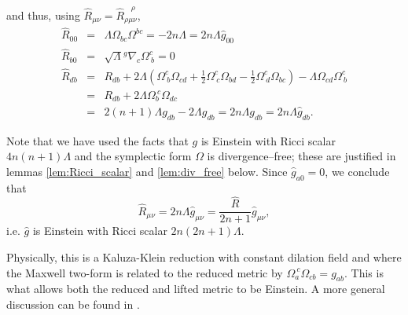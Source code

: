 and thus, using $\hat{R}_{\mu\nu}=\hat{R}_{\rho\mu\nu}^{\ \ \ \ \rho}$,
\begin{eqnarray*}
\hat{R}_{00} & = & \Lambda\Omega_{bc}\Omega^{bc}=-2n\Lambda=2n\Lambda\hat{g}_{00}\\
\hat{R}_{b0} & = & \sqrt{\Lambda}{^g\nabla}_{c}\Omega_{\ b}^{c}=0\\
\hat{R}_{db} & = & R_{db}+2\Lambda(\Omega_{\ b}^{c}\Omega_{cd}+\frac{1}{2}\Omega_{\ c}^{c}\Omega_{bd}-\frac{1}{2}\Omega_{\ d}^{c}\Omega_{bc})-\Lambda\Omega_{cd}\Omega_{\ b}^{c}\\
 & = & R_{db}+2\Lambda\Omega_{b}^{\ c}\Omega_{dc}\\
 & = & 2(n+1)\Lambda g_{db}-2\Lambda g_{db}=2n\Lambda g_{db}=2n\Lambda\hat{g}_{db}.
\end{eqnarray*}


Note that we have used the facts that $g$ is Einstein with Ricci
scalar $4n(n+1)\Lambda$ and the symplectic form $\Omega$ is divergence--free;
these are justified in lemmas \ref{lem:Ricci_scalar} and \ref{lem:div_free} below. Since $\hat{g}_{a0}=0$,
we conclude that
\[
\hat{R}_{\mu\nu}=2n\Lambda\hat{g}_{\mu\nu}=\frac{\hat{R}}{2n+1}\hat{g}_{\mu\nu},
\]
i.e. $\hat{g}$ is Einstein with Ricci scalar $2n(2n+1)\Lambda$.
\koniec

Physically, this is a Kaluza-Klein reduction with constant dilation
field and where the Maxwell two-form is related to the reduced metric
by $\Omega_{a}^{\ c}\Omega_{cb}=g_{ab}$. This is what allows both
the reduced and lifted metric to be Einstein. A more general discussion
can be found in \cite{Pope}.

